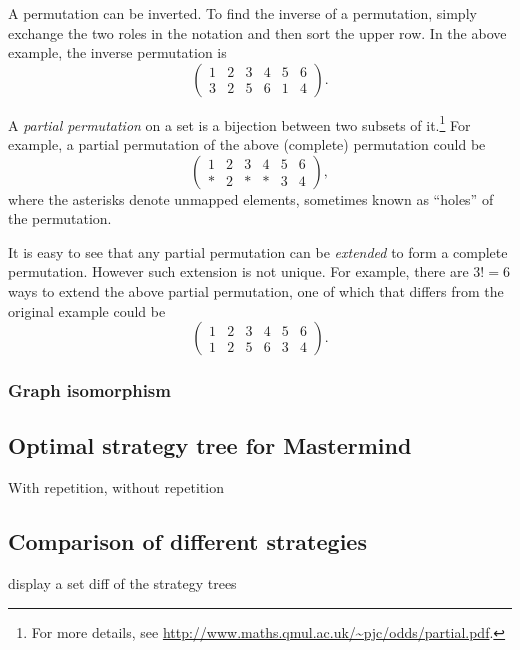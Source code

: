 A permutation can be inverted. To find the inverse of a permutation, simply exchange the two roles in the notation and then sort the upper row. In the above example, the inverse permutation is
\[
\begin{pmatrix}
1 & 2 & 3 & 4 & 5 & 6 \\
3 & 2 & 5 & 6 & 1 & 4
\end{pmatrix} .
\]


A \emph{partial permutation} on a set is a bijection between two subsets of it.\footnote{For more details, see \url{http://www.maths.qmul.ac.uk/~pjc/odds/partial.pdf}.}
For example, a partial permutation of the above (complete) permutation could be
\[
\begin{pmatrix}
1 & 2 & 3 & 4 & 5 & 6 \\
* & 2 & * & * & 3 & 4
\end{pmatrix} ,
\]
where the asterisks denote unmapped elements, sometimes known as ``holes'' of the permutation. 

It is easy to see that any partial permutation can be \emph{extended} to form a complete permutation. However such extension is not unique. For example, there are $3! = 6$ ways to extend the above partial permutation, one of which that differs from the original example could be
\[
\begin{pmatrix}
1 & 2 & 3 & 4 & 5 & 6 \\
1 & 2 & 5 & 6 & 3 & 4
\end{pmatrix} .
\]

\subsubsection{Graph isomorphism}

\subsection{Optimal strategy tree for Mastermind}

With repetition, without repetition

\subsection{Comparison of different strategies}

display a set diff of the strategy trees